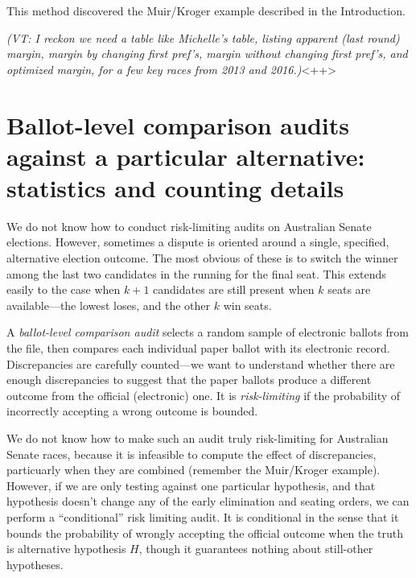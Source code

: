 \documentclass[10pt,a4paper]{article}
\newcommand{\VTNote}[1]{{\it(VT: #1)}}
\begin{document}
This method discovered the Muir/Kroger example described in the Introduction.

\VTNote{I reckon we need a table like Michelle's table, listing apparent (last round) margin, margin by changing first pref's, margin without changing first pref's, and optimized margin, for a few key races from 2013 and 2016.}<++>


\section{Ballot-level comparison audits against a particular alternative: statistics and counting details} \label{sec:conditionalRLAs}

We do not know how to conduct risk-limiting audits on Australian Senate elections.  However, sometimes a dispute is oriented around a single, specified, alternative election outcome.  The most obvious of these is to switch the winner among the last two candidates in the running for the final seat.  This extends easily to the case when $k+1$ candidates are still present when $k$ seats are available---the lowest loses, and the other $k$ win seats. 


A \emph{ballot-level comparison audit} selects a random sample of electronic ballots from the file, then compares each individual paper ballot with its electronic record.  Discrepancies are carefully counted---we want to understand whether there are enough discrepancies to suggest that the paper ballots produce a different outcome from the official (electronic) one.   It is \emph{risk-limiting} if the probability of incorrectly accepting a wrong outcome is bounded.

We do not know how to make such an audit truly risk-limiting for Australian Senate races, because it is infeasible to compute the effect of discrepancies, particuarly when they are combined (remember the Muir/Kroger example).  However, if we are only testing against one particular hypothesis, and that hypothesis doesn't change any of the early elimination and seating orders, we can perform a ``conditional'' risk limiting audit.  It is conditional in the sense that it bounds the probability of wrongly accepting the official outcome when the truth is alternative hypothesis $H$, though it guarantees nothing about still-other hypotheses.
\end{document}
